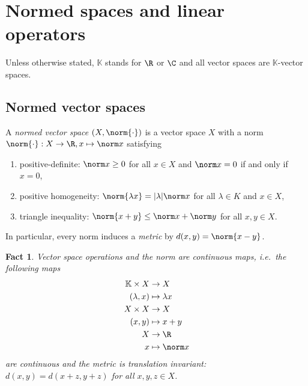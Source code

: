 \documentclass[a4paper]{article}
\newtheorem*{fact}{Fact}
\newcommand{\K}{{\mathbb{K}}} %
\begin{document}


\tableofcontents

\section{Normed spaces and linear operators}

Unless otherwise stated, \(\K\) stands for \(\R\) or \(\C\) and all vector spaces are \(\K\)-vector spaces.

\subsection{Normed vector spaces}

\begin{definition}
  A \emph{normed vector space} \((X, \norm{\cdot})\) is a vector space \(X\) with a norm \(\norm{\cdot}: X \to \R, x \mapsto \norm x\) satisfying
  \begin{enumerate}
  \item positive-definite: \(\norm x \geq 0\) for all \(x \in X\) and \(\norm x = 0\) if and only if \(x = 0\),
  \item positive homogeneity: \(\norm{\lambda x} = |\lambda| \norm x\) for all \(\lambda \in K\) and \(x \in X\),
  \item triangle inequality: \(\norm{x + y} \leq \norm x + \norm y\) for all \(x, y \in X\).
  \end{enumerate}
\end{definition}

In particular, every norm induces a \emph{metric} by \(d(x, y) = \norm{x - y}\).

\begin{fact}
Vector space operations and the norm are continuous maps, i.e.\ the following maps
\begin{align*}
  \K \times X &\to X \\
  (\lambda, x) &\mapsto \lambda x \\
  X \times X &\to X \\
  (x, y) &\mapsto x + y \\
  X &\to \R \\
  x &\mapsto \norm x
\end{align*}
are continuous and the metric is translation invariant: \(d(x, y) = d(x + z, y + z)\) for all \(x, y, z \in X\).
\end{fact}
\end{document}
